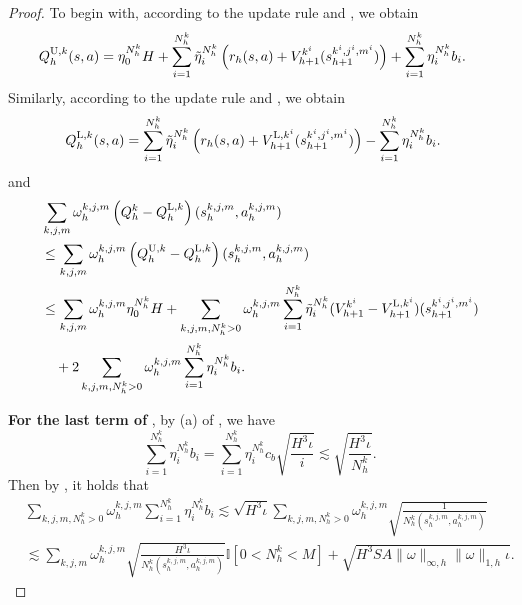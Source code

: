 \documentclass{article}
\newcommand{\U}{\textnormal{U}}
\newcommand{\LL}{\textnormal{L}}
\begin{document}
\begin{proof}
    To begin with, according to the update rule  and , we obtain
    \begin{align*}
        Q_h^{\U,k}(s,a) &= \eta_0^{N_h^k} H + \sum_{i=1}^{N_h^k} \Tilde{\eta}_i^{N_h^k} \left( r_h(s, a) + V_{h+1}^{k^i}(s_{h+1}^{k^i,j^i,m^i})\right) + \sum_{i=1}^{N_h^k} \eta_i^{N_h^k}b_{i}.
    \end{align*}
    Similarly, according to the update rule  and , we obtain
    \begin{align*}
        Q_h^{\LL,k}(s,a) &= \sum_{i=1}^{N_h^k} \Tilde{\eta}_i^{N_h^k} \left( r_h(s, a) + V_{h+1}^{\LL,k^i}(s_{h+1}^{k^i,j^i,m^i})\right) - \sum_{i=1}^{N_h^k} \eta_i^{N_h^k}b_{i}.
    \end{align*}
    and 
    \begin{align}
    \label{weightbegin}
        &\sum_{k,j,m} \omega_{h}^{k,j,m} \left(Q_h^k - Q_h^{\LL,k}\right)(s_h^{k,j,m}, a_h^{k,j,m}) \nonumber\\
        &\leq \sum_{k,j,m} \omega_{h}^{k,j,m} \left(Q_h^{\U,k} - Q_h^{\LL,k}\right)(s_h^{k,j,m}, a_h^{k,j,m}) \nonumber\\
        &\leq \sum_{k,j,m} \omega_{h}^{k,j,m}\eta_0^{N_h^k}H + \sum_{k,j,m,N_h^k>0} \omega_{h}^{k,j,m} \sum_{i = 1}^{N_h^k}\tilde{\eta}_i^{N_h^k}(V_{h+1}^{k^i} - V_{h+1}^{\LL,k^i})(s_{h+1}^{k^i,j^i,m^i}) \nonumber\\
        &\quad + 2\sum_{k,j,m,N_h^k>0} \omega_{h}^{k,j,m}\sum_{i=1}^{N_h^k} \eta_i^{N_h^k}b_{i}.
    \end{align}


\textbf{For the last term of }, by (a) of , we have
$$\sum_{i=1}^{N_h^k} \eta_i^{N_h^k}b_{i}=\sum_{i = 1}^{N_h^k} \eta_i^{N_h^k} c_b\sqrt{\frac{H^3\iota}{i}} \lesssim \sqrt{\frac{H^3\iota}{N_h^k}}.$$
Then by , it holds that
\begin{align}
    \label{recur3}
    &\sum_{k,j,m,N_h^k>0} \omega_{h}^{k,j,m}\sum_{i=1}^{N_h^k} \eta_i^{N_h^k}b_{i} \lesssim \sqrt{H^3\iota}\sum_{k,j,m,N_h^k>0}  \omega_{h}^{k,j,m}\sqrt{\frac{1}{N_h^k(s_h^{k,j,m},a_h^{k,j,m})}} \nonumber\\
    &\lesssim \sum_{k,j,m}  \omega_{h}^{k,j,m}\sqrt{\frac{H^3\iota}{N_h^k(s_h^{k,j,m},a_h^{k,j,m})}}\mathbb{I}\left[ 0<N_h^k< M\right] + \sqrt{H^3SA\|\omega\|_{\infty,h}\|\omega\|_{1,h}\iota} .
\end{align}


\end{proof}
\end{document}

